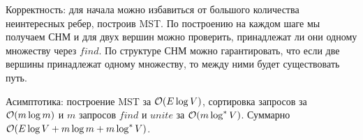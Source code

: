 \begin{enumerate}
\begin{solution}
      Корректность: для начала можно избавиться от большого количества неинтересных ребер, построив MST. По построению на каждом шаге мы получаем СНМ и для двух вершин можно проверить, принадлежат ли они одному множеству через $find$. По структуре СНМ можно гарантировать, что если две вершины принадлежат одному множеству, то между ними будет существовать путь.

      Асимптотика: построение MST за $\mathcal{O}(E \log V)$, сортировка запросов за $\mathcal{O}(m \log m)$ и $m$ запросов $find$ и $unite$ за $\mathcal{O}(m \log^* V)$. Суммарно $\mathcal{O}(E \log V + m \log m + m \log^* V)$.
    \end{solution}
	

\end{enumerate}
